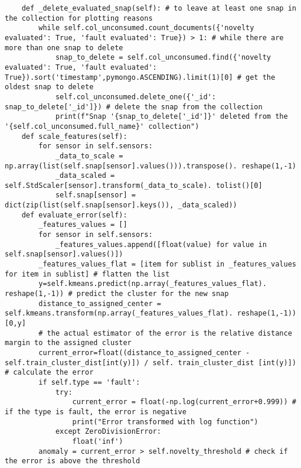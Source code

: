 \begin{verbatim}
    def _delete_evaluated_snap(self): # to leave at least one snap in the collection for plotting reasons
        while self.col_unconsumed.count_documents({'novelty evaluated': True, 'fault evaluated': True}) > 1: # while there are more than one snap to delete
            snap_to_delete = self.col_unconsumed.find({'novelty evaluated': True, 'fault evaluated': True}).sort('timestamp',pymongo.ASCENDING).limit(1)[0] # get the oldest snap to delete
            self.col_unconsumed.delete_one({'_id': snap_to_delete['_id']}) # delete the snap from the collection
            print(f"Snap '{snap_to_delete['_id']}' deleted from the '{self.col_unconsumed.full_name}' collection")
    def scale_features(self):
        for sensor in self.sensors:
            _data_to_scale = np.array(list(self.snap[sensor].values())).transpose(). reshape(1,-1)
            _data_scaled = self.StdScaler[sensor].transform(_data_to_scale). tolist()[0]
            self.snap[sensor] = dict(zip(list(self.snap[sensor].keys()), _data_scaled))
    def evaluate_error(self):
        _features_values = []
        for sensor in self.sensors:
            _features_values.append([float(value) for value in self.snap[sensor].values()])
        _features_values_flat = [item for sublist in _features_values for item in sublist] # flatten the list
        y=self.kmeans.predict(np.array(_features_values_flat). reshape(1,-1)) # predict the cluster for the new snap
        distance_to_assigned_center = self.kmeans.transform(np.array(_features_values_flat). reshape(1,-1))[0,y]
        # the actual estimator of the error is the relative distance margin to the assigned cluster
        current_error=float((distance_to_assigned_center - self.train_cluster_dist[int(y)]) / self. train_cluster_dist [int(y)]) # calculate the error
        if self.type == 'fault':
            try:
                current_error = float(-np.log(current_error+0.999)) # if the type is fault, the error is negative
                print("Error transformed with log function")
            except ZeroDivisionError:
                float('inf')
        anomaly = current_error > self.novelty_threshold # check if the error is above the threshold
        

\end{verbatim}
